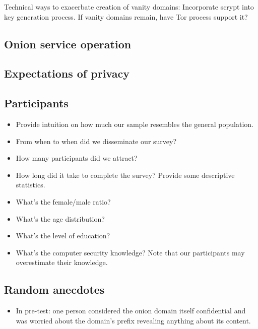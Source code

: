 Technical ways to exacerbate creation of vanity domains: Incorporate scrypt into
key generation process.
If vanity domains remain, have Tor process support it?

\subsection{Onion service operation}
\subsection{Expectations of privacy}

\subsection{Participants}
\begin{itemize}
    \item Provide intuition on how much our sample resembles the general
        population.
    \item From when to when did we disseminate our survey?
    \item How many participants did we attract?
    \item How long did it take to complete the survey?  Provide some descriptive statistics.
    \item What's the female/male ratio?
    \item What's the age distribution?
    \item What's the level of education?
    \item What's the computer security knowledge?  Note that our participants
        may overestimate their knowledge.
\end{itemize}

\subsection{Random anecdotes}
\begin{itemize}
    \item In pre-test: one person considered the onion domain itself
        confidential and was worried about the domain's prefix revealing
        anything about its content.
\end{itemize}
